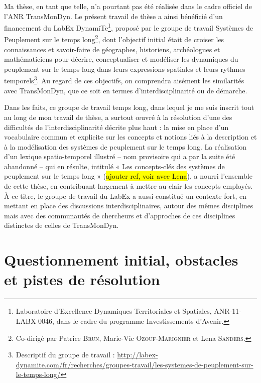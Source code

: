 Ma thèse, en tant que telle, n'a pourtant pas été réalisée dans le cadre officiel de l'ANR TransMonDyn.
Le présent travail de thèse a ainsi bénéficié d'un financement du LabEx DynamiTe\footnote{
	Laboratoire d'Excellence \og Dynamiques Territoriales et Spatiales\fg{}, ANR-11-LABX-0046, dans le cadre du programme \og Investissements d'Avenir\fg{}.
}, proposé par le groupe de travail \og Systèmes de Peuplement sur le temps long\fg{}\footnote{
	Co-dirigé par Patrice \textsc{Brun}, Marie-Vic \textsc{Ozouf-Marignier} et Lena \textsc{Sanders}.
}, dont l'objectif initial était de \og croiser les connaissances et savoir-faire de géographes, historiens, archéologues et mathématiciens pour décrire, conceptualiser et modéliser les dynamiques du peuplement sur le temps long dans leurs expressions spatiales et leurs rythmes temporels\fg{}\footnote{
	Descriptif du groupe de travail : \href{http://labex-dynamite.com/fr/recherches/groupes-travail/les-systemes-de-peuplement-sur-le-temps-long/}{http://labex-dynamite.com/fr/recherches/groupes-travail/les-systemes-de-peuplement-sur-le-temps-long/}
}.
Au regard de ces objectifs, on comprendra aisément les similarités avec TransMonDyn, que ce soit en termes d'interdisciplinarité ou de démarche.

Dans les faits, ce groupe de travail \og temps long\fg{}, dans lequel je me suis inscrit tout au long de mon travail de thèse, a surtout œuvré à la résolution d'une des difficultés de l'interdisciplinarité décrite plus haut : la mise en place d'un vocabulaire commun et explicite sur les concepts et notions liés à la description et à la modélisation des systèmes de peuplement sur le temps long.
La réalisation d'un \og lexique spatio-temporel illustré\fg{} -- nom provisoire qui a par la suite été abandonné -- qui en résulte, intitulé \og « Les concepts-clés des systèmes de peuplement sur le temps long » (\hl{ajouter ref, voir avec Lena}), a nourri l'ensemble de cette thèse, en contribuant largement à mettre au clair les concepts employés.
À ce titre, le groupe de travail du LabEx a aussi constitué un contexte fort, en mettant en place des discussions interdisciplinaires, autour des mêmes disciplines mais avec des communautés de chercheurs et d'approches de ces disciplines distinctes de celles de TransMonDyn.

\let\orisectionmark\sectionmark
\renewcommand\sectionmark[1]{}%
\section{Questionnement initial, obstacles et pistes de résolution \label{sec:evolution}}
\orisectionmark{Évolution du questionnement}
\let\sectionmark\orisectionmark

